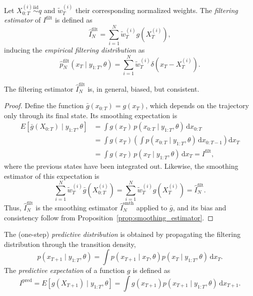 \begin{definition}
    Let $X_{0:T}^{(i)} \overset{\mathrm{iid}}{\sim} q$ and $\tilde{w}_T^{(i)}$ their corresponding normalized weights. 
    The \emph{filtering estimator} of $I^{\mathrm{filt}}$ is defined as
    \begin{equation}
        \hat{I}_N^{\mathrm{filt}} = \sum_{i=1}^{N}\tilde{w}_{T}^{(i)} g(X_T^{(i)}),
    \end{equation}
    inducing the \emph{empirical filtering distribution} as
    \begin{equation}
        \hat{p}_N^{\mathrm{filt}}(x_T \mid y_{1:T},\theta) = \sum_{i=1}^{N} \tilde{w}_T^{(i)} \delta(x_T-X_T^{(i)}).
    \end{equation}
\end{definition}

\begin{proposition}
    \label{prop:filtering_estimator}
    The filtering estimator $\hat{I}_N^{\mathrm{filt}}$ is, in general, biased, but consistent.
\end{proposition}
\begin{proof}
    Define the function $\bar{g}(x_{0:T}) = g(x_T)$, which depends on the trajectory only through its final state. Its smoothing expectation is
    \begin{align}
        E\left[\bar{g}(X_{0:T}) \mid y_{1:T},\theta\right] &= \int g(x_T)\, p(x_{0:T}\mid y_{1:T},\theta)\,\mathrm{d}x_{0:T} \\
        &= \int g(x_T) \left(\int p(x_{0:T}\mid y_{1:T},\theta)\,\mathrm{d}x_{0:T-1}\right)\mathrm{d}x_T \\
        &= \int g(x_T)\, p(x_T\mid y_{1:T},\theta)\,\mathrm{d}x_T = I^{\mathrm{filt}},
    \end{align}
    where the previous states have been integrated out. Likewise, the smoothing estimator of this expectation is
    \begin{equation}
        \sum_{i=1}^{N} \tilde{w}_T^{(i)} \bar{g}(X_{0:T}^{(i)}) = \sum_{i=1}^{N} \tilde{w}_T^{(i)} g(X_T^{(i)}) = \hat{I}_N^{\mathrm{filt}}.
    \end{equation}
    Thus, $\hat{I}_N^{\mathrm{filt}}$ is the smoothing estimator $\hat{I}_N^{\mathrm{smth}}$ applied to $\bar{g}$, and its bias and consistency follow from Proposition~\ref{prop:smoothing_estimator}.
\end{proof}

\begin{definition}
    The (one-step) \emph{predictive distribution} is obtained by propagating the filtering distribution through the transition density,
    \begin{equation}
        p(x_{T+1} \mid y_{1:T}, \theta) = \int p(x_{T+1} \mid x_T, \theta)p(x_T \mid y_{1:T}, \theta)\,\mathrm{d}x_T.
    \end{equation}
    The \emph{predictive expectation} of a function $g$ is defined as
    \begin{equation}
        I^{\mathrm{pred}} = E\left[g(X_{T+1}) \mid y_{1:T}, \theta\right] = \int g(x_{T+1})p(x_{T+1} \mid y_{1:T}, \theta)\,\mathrm{d}x_{T+1}.
    \end{equation}
\end{definition}

